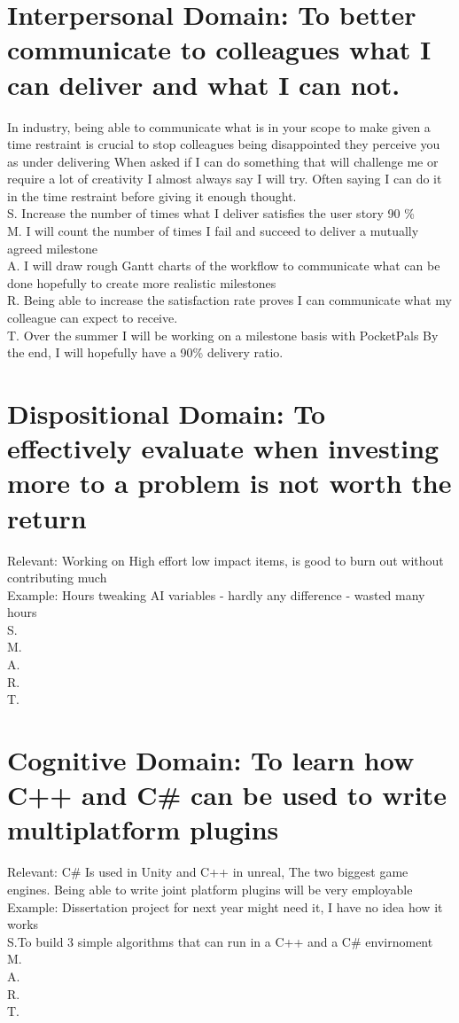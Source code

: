 \documentclass{scrartcl}
\begin{document}
\section{Interpersonal Domain: To better communicate to colleagues what I can deliver and what I can not.}
In industry, being able to communicate what is in your scope to make given a time restraint is crucial to stop colleagues
being disappointed they perceive you as under delivering
When asked if I can do something that will challenge me or require a lot of creativity I almost always say I will try.
Often saying I can do it in the time restraint before giving it enough thought. \\
S. Increase the number of times what I deliver satisfies the user story 90 \% \\
M. I will count the number of times I fail and succeed to deliver a mutually agreed milestone\\
A. I will draw rough Gantt charts of the workflow to communicate what can be done hopefully to create more realistic milestones \\
R. Being able to increase the satisfaction rate proves I can communicate what my colleague can expect to receive.\\
T. Over the summer I will be working on a milestone basis with PocketPals By the end, I will hopefully have a 90\%  delivery ratio.\\

\section{Dispositional Domain: To effectively evaluate when investing more to a problem is not worth the return}
Relevant: Working on High effort low impact items, is good to burn out without contributing much\\
Example: Hours tweaking AI variables - hardly any difference - wasted many hours\\
S.\\
M.\\
A.\\
R.\\
T. \\

\section{Cognitive Domain: To learn how C++ and C\#  can be used to write multiplatform plugins}
Relevant: C\# Is used in Unity and C++ in unreal, The two biggest game engines. Being able to write joint platform plugins will be very employable\\
Example: Dissertation project for next year might need it, I have no idea how it works  \\
S.To build 3 simple algorithms that can run in a C++ and a C\# envirnoment\\
M.\\
A.\\
R.\\
T. \\
\end{document}

